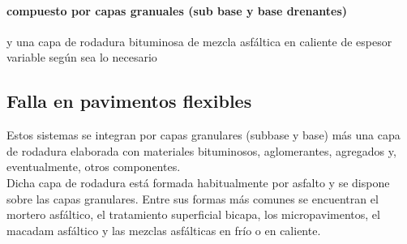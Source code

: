\paragraph{compuesto por capas granuales (sub base y base drenantes)} y una capa de rodadura bituminosa de mezcla asfáltica en caliente de espesor variable según sea lo necesario

%

\subsection{Falla en pavimentos flexibles}

Estos sistemas se integran por capas granulares (subbase y base) más una capa de rodadura elaborada con materiales bituminosos, aglomerantes, agregados y, eventualmente, otros componentes.\\
Dicha capa de rodadura está formada habitualmente por asfalto y se dispone sobre las capas granulares. Entre sus formas más comunes se encuentran el mortero asfáltico, el tratamiento superficial bicapa, los micropavimentos, el macadam asfáltico y las mezclas asfálticas en frío o en caliente.

